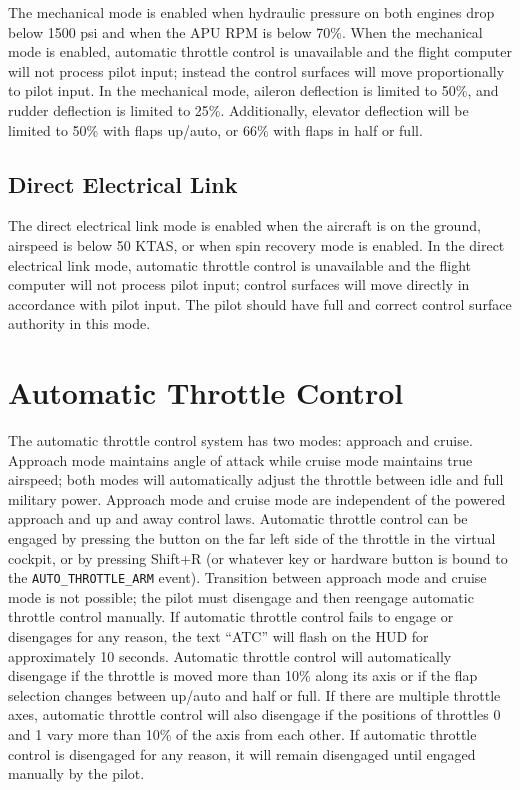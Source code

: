 \documentclass[11pt]{report}
\begin{document}
The mechanical mode is enabled when hydraulic pressure on both engines drop below 1500 psi and when the APU RPM is below 70\%.  When the mechanical mode is enabled, automatic throttle control is unavailable and the flight computer will not process pilot input; instead the control surfaces will move proportionally to pilot input.  In the mechanical mode, aileron deflection is limited to 50\%, and rudder deflection is limited to 25\%.  Additionally, elevator deflection will be limited to 50\% with flaps up/auto, or 66\% with flaps in half or full.

\subsection{Direct Electrical Link}

The direct electrical link mode is enabled when the aircraft is on the ground, airspeed is below 50 KTAS, or when spin recovery mode is enabled.  In the direct electrical link mode, automatic throttle control is unavailable and the flight computer will not process pilot input; control surfaces will move directly in accordance with pilot input.  The pilot should have full and correct control surface authority in this mode.

\section{Automatic Throttle Control}

The automatic throttle control system has two modes: approach and cruise.  Approach mode maintains angle of attack while cruise mode maintains true airspeed; both modes will automatically adjust the throttle between idle and full military power.  Approach mode and cruise mode are independent of the powered approach and up and away control laws.  Automatic throttle control can be engaged by pressing the button on the far left side of the throttle in the virtual cockpit, or by pressing Shift+R (or whatever key or hardware button is bound to the \texttt{AUTO\_THROTTLE\_ARM} event). Transition between approach mode and cruise mode is not possible; the pilot must disengage and then reengage automatic throttle control manually.  If automatic throttle control fails to engage or disengages for any reason, the text ``ATC'' will flash on the HUD for approximately 10 seconds. Automatic throttle control will automatically disengage if the throttle is moved more than 10\% along its axis or if the flap selection changes between up/auto and half or full.  If there are multiple throttle axes, automatic throttle control will also disengage if the positions of throttles 0 and 1 vary more than 10\% of the axis from each other.  If automatic throttle control is disengaged for any reason, it will remain disengaged until engaged manually by the pilot.
\end{document}
